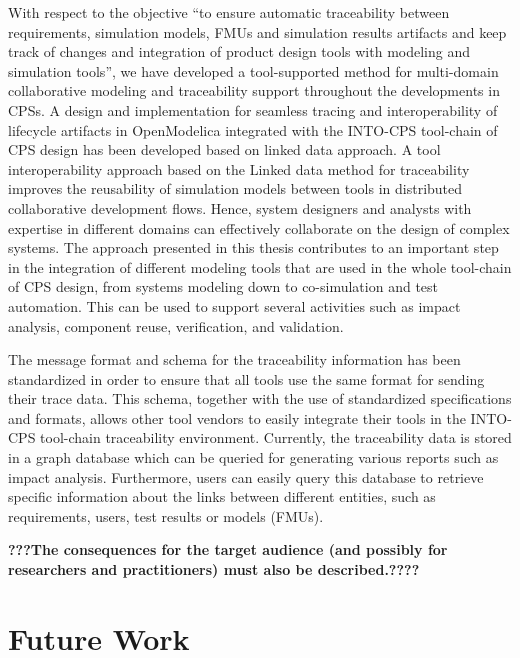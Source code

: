 With respect to the objective “to ensure automatic traceability between requirements, simulation models, FMUs and simulation results artifacts and keep track of changes and integration of product design tools with modeling and simulation tools”, we have developed a tool-supported method for multi-domain  collaborative modeling and traceability support throughout the developments in CPSs. A design and implementation for seamless tracing and interoperability of lifecycle artifacts in OpenModelica integrated with the INTO-CPS tool-chain of CPS design has been developed based on linked data approach. A tool interoperability approach based on the Linked data method for traceability improves the reusability of simulation models between tools in distributed collaborative development flows. Hence, system designers and analysts with expertise in different domains can effectively collaborate on the design of complex systems. The approach presented in this thesis contributes to an important step in the integration of different modeling tools that are used in the whole tool-chain of CPS design, from systems modeling down to co-simulation and test automation. This can be used to support several activities such as impact analysis, component reuse, verification, and validation. 

The message format and schema for the traceability information has been standardized in order to ensure that all tools use the same format for sending their trace data. This schema, together with the use of standardized specifications and formats, allows other tool vendors to easily integrate their tools in the INTO-CPS tool-chain traceability environment. Currently, the traceability data is stored in a graph database which can be queried for generating various reports such as impact analysis. Furthermore, users can easily query this database to retrieve specific information about the links between different entities, such as requirements, users, test results or models (FMUs).


\textbf{???The consequences for the target audience (and possibly for researchers and practitioners) must also be described.????}



\section{Future Work}
\label{sec:futurework}




